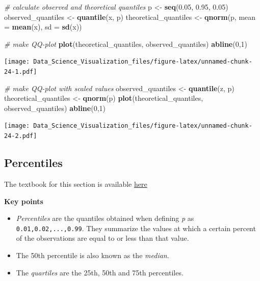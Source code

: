 \documentclass[
]{article}
\newenvironment{Shaded}{\begin{snugshade}}{\end{snugshade}}
\newcommand{\CommentTok}[1]{\textcolor[rgb]{0.56,0.35,0.01}{\textit{#1}}}
\newcommand{\DataTypeTok}[1]{\textcolor[rgb]{0.13,0.29,0.53}{#1}}
\newcommand{\DecValTok}[1]{\textcolor[rgb]{0.00,0.00,0.81}{#1}}
\newcommand{\FloatTok}[1]{\textcolor[rgb]{0.00,0.00,0.81}{#1}}
\newcommand{\KeywordTok}[1]{\textcolor[rgb]{0.13,0.29,0.53}{\textbf{#1}}}
\newcommand{\NormalTok}[1]{#1}
\newcommand{\StringTok}[1]{\textcolor[rgb]{0.31,0.60,0.02}{#1}}
\providecommand{\tightlist}{%
  \setlength{\itemsep}{0pt}\setlength{\parskip}{0pt}}
\begin{document}
\begin{Shaded}
\begin{Highlighting}[]
\CommentTok{# calculate observed and theoretical quantiles}
\NormalTok{p <-}\StringTok{ }\KeywordTok{seq}\NormalTok{(}\FloatTok{0.05}\NormalTok{, }\FloatTok{0.95}\NormalTok{, }\FloatTok{0.05}\NormalTok{)}
\NormalTok{observed_quantiles <-}\StringTok{ }\KeywordTok{quantile}\NormalTok{(x, p)}
\NormalTok{theoretical_quantiles <-}\StringTok{ }\KeywordTok{qnorm}\NormalTok{(p, }\DataTypeTok{mean =} \KeywordTok{mean}\NormalTok{(x), }\DataTypeTok{sd =} \KeywordTok{sd}\NormalTok{(x))}

\CommentTok{# make QQ-plot}
\KeywordTok{plot}\NormalTok{(theoretical_quantiles, observed_quantiles)}
\KeywordTok{abline}\NormalTok{(}\DecValTok{0}\NormalTok{,}\DecValTok{1}\NormalTok{)}
\end{Highlighting}
\end{Shaded}

\texttt{[image: Data\_Science\_Visualization\_files/figure-latex/unnamed-chunk-24-1.pdf]}

\begin{Shaded}
\begin{Highlighting}[]
\CommentTok{# make QQ-plot with scaled values}
\NormalTok{observed_quantiles <-}\StringTok{ }\KeywordTok{quantile}\NormalTok{(z, p)}
\NormalTok{theoretical_quantiles <-}\StringTok{ }\KeywordTok{qnorm}\NormalTok{(p) }
\KeywordTok{plot}\NormalTok{(theoretical_quantiles, observed_quantiles)}
\KeywordTok{abline}\NormalTok{(}\DecValTok{0}\NormalTok{,}\DecValTok{1}\NormalTok{)}
\end{Highlighting}
\end{Shaded}

\texttt{[image: Data\_Science\_Visualization\_files/figure-latex/unnamed-chunk-24-2.pdf]}

\hypertarget{percentiles}{%
\subsection{Percentiles}\label{percentiles}}

The textbook for this section is available
\href{https://rafalab.github.io/dsbook/distributions.html\#percentiles}{here}

\textbf{Key points}

\begin{itemize}
\tightlist
\item
  \emph{Percentiles} are the quantiles obtained when defining \emph{p}
  as \texttt{0.01,0.02,...,0.99}. They summarize the values at which a
  certain percent of the observations are equal to or less than that
  value.
\item
  The 50th percentile is also known as the \emph{median}.
\item
  The \emph{quartiles} are the 25th, 50th and 75th percentiles.
\end{itemize}
\end{document}
